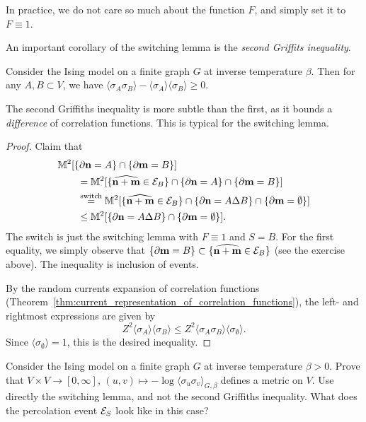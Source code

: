 In practice, we do not care so much about the function $F$, and simply set it to $F\equiv 1$.

An important corollary of the switching lemma is the \emph{second Griffits inequality}.

\begin{lemma}
    Consider the Ising model on a finite graph $G$ at inverse temperature $\beta$.
    Then for any $A,B\subset V$, we have
    $\langle\sigma_{A}\sigma_B\rangle-\langle\sigma_A\rangle\langle\sigma_B\rangle\geq 0$.
\end{lemma}

The second Griffiths inequality is more subtle than the first,
as it bounds a \emph{difference} of correlation functions.
This is typical for the switching lemma.

\begin{proof}
    Claim that
    \begin{align}
        &\M^2[\{\partial\n=A\}\cap\{\partial\m=B\}]
        \\
        &\qquad=
        \M^2[\{\widehat{\n+\m} \in \calE_B\}\cap\{\partial\n=A\}\cap\{\partial\m=B\}]
        \\
        &\qquad\stackrel{\text{switch}}=
        \M^2[\{\widehat{\n+\m} \in \calE_B\}\cap\{\partial\n=A\Delta B\}\cap\{\partial\m=\emptyset\}]
        \\
        &\qquad\leq
        \M^2[\{\partial\n=A\Delta B\}\cap\{\partial\m=\emptyset\}].
    \end{align}
    The switch is just the switching lemma with $F\equiv 1$ and $S=B$.
    For the first equality, we simply observe that $\{\partial\mathbf{m}=B\}\subset \{\widehat{\mathbf{n}+\mathbf{m}} \in \mathcal E_B\}$
    (see the exercise above).
    The inequality is inclusion of events.

    By the random currents expansion of correlation functions (Theorem~\ref{thm:current_representation_of_correlation_functions}),
    the left- and rightmost expressions are given by
    \[
        Z^2\langle\sigma_A\rangle\langle\sigma_B\rangle
        \leq
        Z^2\langle\sigma_A\sigma_B\rangle\langle\sigma_\emptyset\rangle.
    \]
    Since $\langle\sigma_\emptyset\rangle=1$, this is the desired inequality.
\end{proof}

\begin{exercise}
    Consider the Ising model on a finite graph $G$
    at inverse temperature $\beta>0$.
    Prove that $V\times V\to [0,\infty],\,
    (u,v)\mapsto-\log\langle\sigma_u\sigma_v\rangle_{G,\beta}$
    defines a metric on $V$.
    Use directly the switching lemma, and not the second Griffiths inequality.
    What does the percolation event $\mathcal E_S$ look like in this case?
\end{exercise}
